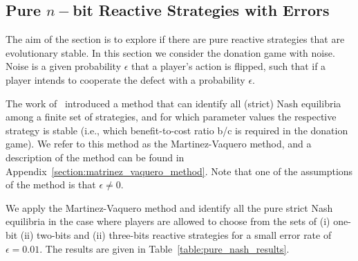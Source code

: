 \documentclass{article}
\theoremstyle{definition}
\begin{document}
\subsection{Pure \(n-\)bit Reactive Strategies with Errors}\label{section:pure_strategies}

The aim of the section is to explore if there are pure reactive strategies that
are evolutionary stable. In this section we consider the donation game with
noise. Noise is a given probability \(\epsilon\) that a player's action is
flipped, such that if a player intends to cooperate the defect with a
probability \(\epsilon\).

The work of~\citep{hilbe:PNAS:2017} introduced a method that can identify all
(strict) Nash equilibria among a finite set of strategies, and for which
parameter values the respective strategy is stable (i.e., which benefit-to-cost
ratio b/c is required in the donation game). We refer to this method as the
Martinez-Vaquero method, and a description of the method can be found in
Appendix~\ref{section:matrinez_vaquero_method}. Note that one of the assumptions
of the method is that \(\epsilon \neq 0\).

We apply the Martinez-Vaquero method and identify all the pure strict Nash
equilibria in the case where players are allowed to choose from the sets of (i)
one-bit (ii) two-bits and (ii) three-bits reactive strategies for a small error
rate of \(\epsilon=0.01\). The results are given in
Table~\ref{table:pure_nash_results}.
\end{document}
